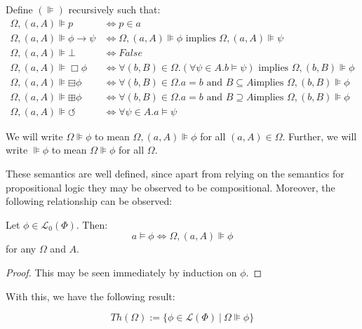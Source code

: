 \begin{definition}\label{evil-semantics-def}
 Define $(\VDash)$ recursively such that:
\begin{align*}
  {\Omega},(a,A){\VDash} p & {\iff}p{\in}a\\
  {\Omega},(a,A){\VDash} {\phi}{\rightarrow}{\psi} &
  {\iff}{\Omega},(a,A){\VDash}{\phi}\text{ implies
  }{\Omega},(a,A){\VDash}{\psi}\\
  {\Omega},(a,A){\VDash}{\bot} & {\iff} False\\
  {\Omega},(a,A){\VDash}\Box {\phi} & {\iff}{\forall}(b,B){\in}{\Omega}.
  ({\forall}{\psi}{\in}A. b{\models}{\psi})\text{ implies
  }{\Omega},(b,B){\VDash}{\phi}\\
  {\Omega},(a,A){\VDash}{\boxminus}{\phi} &
  {\iff}{\forall}(b,B){\in}{\Omega}. a=b\text{ and }B{\subseteq}A\text{
  implies }{\Omega},(b,B){\VDash}{\phi}\\
  {\Omega},(a,A){\VDash}{\boxplus}{\phi} &
  {\iff}{\forall}(b,B){\in}{\Omega}. a=b\text{ and }B{\supseteq}A\text{
  implies }{\Omega},(b,B){\VDash}{\phi}\\
  {\Omega},(a,A){\VDash}{\circlearrowleft} & {\iff}
  {\forall}{\psi}{\in}A.a{\models}{\psi}
\end{align*}
\end{definition}
\begin{remark}
We will write $\Omega \VDash \phi$ to mean $\Omega, (a,A) \VDash \phi$
for all $(a,A) \in \Omega$.  Further, we will write $\VDash \phi$ to
mean $\Omega \VDash \phi$ for all $\Omega$.
\end{remark}
These semantics are well defined, since apart from relying on the semantics
for propositional logic they may be observed to be compositional.
Moreover, the following relationship can be observed:

\begin{lemma}[Truthiness]\label{truthiness}
  Let $\phi \in \mathcal{L}_0 (\Phi)$.  Then:
  \[ a \models \phi \Longleftrightarrow \Omega, (a, A) \VDash \phi \]
  for any $\Omega$ and $A$.
\end{lemma}
\begin{proof}
  This may be seen immediately by induction on $\phi$.
\end{proof}

With this, we have the following result:
\begin{definition}
 $$Th(\Omega) := \{ \phi \in \mathcal{L}(\Phi) \ |\ \Omega \VDash \phi \}$$
\end{definition}

